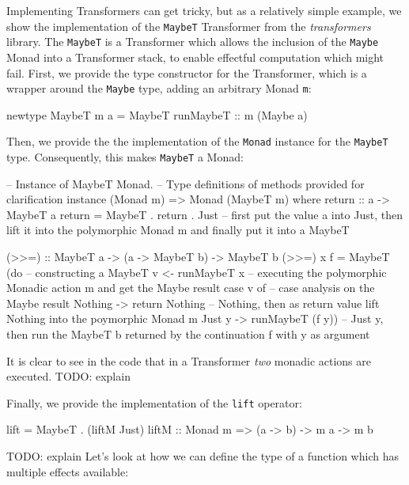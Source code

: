 Implementing Transformers can get tricky, but as a relatively simple example, we show the implementation of the \texttt{MaybeT} Transformer from the \textit{transformers} library. The \texttt{MaybeT} is a Transformer which allows the inclusion of the \texttt{Maybe} Monad into a Transformer stack, to enable effectful computation which might fail. First, we provide the type constructor for the Transformer, which is a wrapper around the \texttt{Maybe} type, adding an arbitrary Monad \texttt{m}:

\begin{HaskellCode}
newtype MaybeT m a = MaybeT { runMaybeT :: m (Maybe a) }
\end{HaskellCode}

Then, we provide the the implementation of the \texttt{Monad} instance for the \texttt{MaybeT} type. Consequently, this makes \texttt{MaybeT} a Monad:

\begin{HaskellCode}
-- Instance of MaybeT Monad.
-- Type definitions of methods provided for clarification
instance (Monad m) => Monad (MaybeT m) where
  return :: a -> MaybeT a
  return = MaybeT . return . Just -- first put the value a into Just, then lift it into the polymorphic Monad m and finally put it into a MaybeT

  (>>=) :: MaybeT a -> (a -> MaybeT b) -> MaybeT b
  (>>=) x f = MaybeT (do -- constructing a MaybeT
      v <- runMaybeT x   -- executing the polymorphic Monadic action m and get the Maybe result
      case v of          -- case analysis on the Maybe result
          Nothing -> return Nothing    -- Nothing, then as return value lift Nothing into the poymorphic Monad m
          Just y  -> runMaybeT (f y))  -- Just y, then run the MaybeT b returned by the continuation f with y as argument
\end{HaskellCode}

It is clear to see in the code that in a Transformer \textit{two} monadic actions are executed. TODO: explain 

Finally, we provide the implementation of the \texttt{lift} operator:
 
\begin{HaskellCode}
lift = MaybeT . (liftM Just)
liftM :: Monad m => (a -> b) -> m a -> m b
\end{HaskellCode}

TODO: explain
Let's look at how we can define the type of a function which has multiple effects available:

